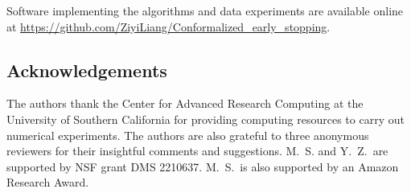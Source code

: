 Software implementing the algorithms and data experiments are available online at \url{https://github.com/ZiyiLiang/Conformalized_early_stopping}.


\subsection*{Acknowledgements}
The authors thank the Center for Advanced Research Computing at the University of Southern California for providing computing resources to carry out numerical experiments.
The authors are also grateful to three anonymous reviewers for their insightful comments and suggestions.
M.~S. and Y.~Z.~are supported by NSF grant DMS 2210637.
M.~S.~is also supported by an Amazon Research Award. 


